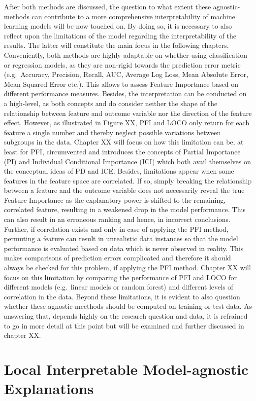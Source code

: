 \documentclass[
]{krantz}
\begin{document}
After both methods are discussed, the question to what extent these agnostic-methods can contribute to a more comprehensive interpretability of machine learning models will be now touched on. By doing so, it is necessary to also reflect upon the limitations of the model regarding the interpretability of the results. The latter will constitute the main focus in the following chapters.
Conveniently, both methods are highly adaptable on whether using classification or regression models, as they are non-rigid towards the prediction error metric (e.g.~Accuracy, Precision, Recall, AUC, Average Log Loss, Mean Absolute Error, Mean Squared Error etc.). This allows to assess Feature Importance based on different performance measures. Besides, the interpretation can be conducted on a high-level, as both concepts and do consider neither the shape of the relationship between feature and outcome variable nor the direction of the feature effect. However, as illustrated in Figure XX, PFI and LOCO only return for each feature a single number and thereby neglect possible variations between subgroups in the data. Chapter XX will focus on how this limitation can be, at least for PFI, circumvented and introduces the concepts of Partial Importance (PI) and Individual Conditional Importance (ICI) which both avail themselves on the conceptual ideas of PD and ICE. Besides, limitations appear when some features in the feature space are correlated. If so, simply breaking the relationship between a feature and the outcome variable does not necessarily reveal the true Feature Importance as the explanatory power is shifted to the remaining, correlated feature, resulting in a weakened drop in the model performance. This can also result in an erroneous ranking and hence, in incorrect conclusions. Further, if correlation exists and only in case of applying the PFI method, permuting a feature can result in unrealistic data instances so that the model performance is evaluated based on data which is never observed in reality. This makes comparisons of prediction errors complicated and therefore it should always be checked for this problem, if applying the PFI method. Chapter XX will focus on this limitation by comparing the performance of PFI and LOCO for different models (e.g.~linear models or random forest) and different levels of correlation in the data. Beyond these limitations, it is evident to also question whether these agnostic-meethods should be computed on training or test data. As answering that, depends highly on the research question and data, it is refrained to go in more detail at this point but will be examined and further discussed in chapter XX.

\hypertarget{local-interpretable-model-agnostic-explanations}{%
\chapter{Local Interpretable Model-agnostic Explanations}\label{local-interpretable-model-agnostic-explanations}}

  

\backmatter
\printindex
\end{document}
